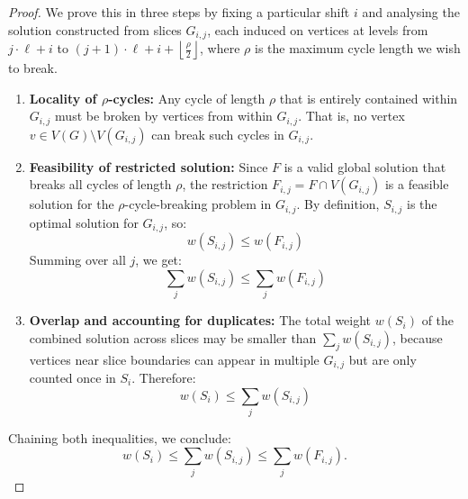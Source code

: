 \begin{proof}
    We prove this in three steps by fixing a particular shift \( i \) and analysing the solution 
    constructed from slices \( G_{i,j} \), each induced on vertices at levels 
    from \( j \cdot \ell + i \) to \( (j + 1) \cdot \ell + i + \left\lfloor \frac{\rho}{2} \right\rfloor \), 
    where \( \rho \) is the maximum cycle length we wish to break.

    \begin{enumerate}
        \item \textbf{Locality of \(\rho\)-cycles:}  
        Any cycle of length \( \rho \) that is entirely contained within \( G_{i,j} \) 
        must be broken by vertices from within \( G_{i,j} \).  
        That is, no vertex \( v \in V(G) \setminus V(G_{i,j}) \) can break such cycles in \( G_{i,j} \).

        \item \textbf{Feasibility of restricted solution:}  
        Since \( F \) is a valid global solution that breaks all cycles of length \( \rho \),  
        the restriction \( F_{i,j} = F \cap V(G_{i,j}) \) is a feasible solution for the 
        \(\rho\)-cycle-breaking problem in \( G_{i,j} \).  
        By definition, \( S_{i,j} \) is the optimal solution for \( G_{i,j} \), so:
        \[
        w(S_{i,j}) \leq w(F_{i,j})
        \]
        Summing over all \( j \), we get:
        \[
        \sum_j w(S_{i,j}) \leq \sum_j w(F_{i,j})
        \]

        \item \textbf{Overlap and accounting for duplicates:}  
        The total weight \( w(S_i) \) of the combined solution across slices may be smaller than 
        \( \sum_j w(S_{i,j}) \), because vertices near slice boundaries can appear in multiple \( G_{i,j} \)  
        but are only counted once in \( S_i \). Therefore:
        \[
        w(S_i) \leq \sum_j w(S_{i,j})
        \]
    \end{enumerate}

    Chaining both inequalities, we conclude:
    \[
    w(S_i) \leq \sum_j w(S_{i,j}) \leq \sum_j w(F_{i,j})\text{.}
    \]
\end{proof}


